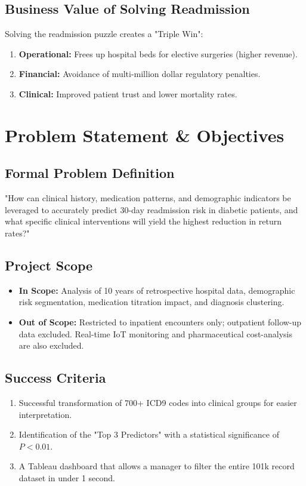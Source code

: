 \documentclass[12pt,a4paper]{article}
\begin{document}
\subsection{Business Value of Solving Readmission}
Solving the readmission puzzle creates a "Triple Win":
\begin{enumerate}
    \item \textbf{Operational:} Frees up hospital beds for elective surgeries (higher revenue).
    \item \textbf{Financial:} Avoidance of multi-million dollar regulatory penalties.
    \item \textbf{Clinical:} Improved patient trust and lower mortality rates.
\end{enumerate}

\section{Problem Statement \& Objectives}
\subsection{Formal Problem Definition}
"How can clinical history, medication patterns, and demographic indicators be leveraged to accurately predict 30-day readmission risk in diabetic patients, and what specific clinical interventions will yield the highest reduction in return rates?"

\subsection{Project Scope}
\begin{itemize}
    \item \textbf{In Scope:} Analysis of 10 years of retrospective hospital data, demographic risk segmentation, medication titration impact, and diagnosis clustering.
    \item \textbf{Out of Scope:} Restricted to inpatient encounters only; outpatient follow-up data excluded. Real-time IoT monitoring and pharmaceutical cost-analysis are also excluded.
\end{itemize}

\subsection{Success Criteria}
\begin{enumerate}
    \item Successful transformation of 700+ ICD9 codes into clinical groups for easier interpretation.
    \item Identification of the "Top 3 Predictors" with a statistical significance of $P < 0.01$.
    \item A Tableau dashboard that allows a manager to filter the entire 101k record dataset in under 1 second.
\end{enumerate}
\end{document}
